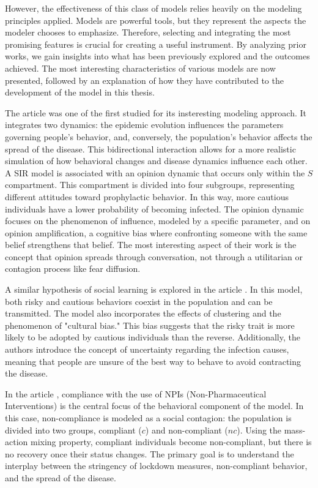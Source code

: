 However, the effectiveness of this class of models relies heavily on the modeling principles applied. Models are powerful tools, but they represent the aspects the modeler chooses to emphasize. Therefore, selecting and integrating the most promising features is crucial for creating a useful instrument. By analyzing prior works, we gain insights into what has been previously explored and the outcomes achieved.
The most interesting characteristics of various models are now presented, followed by an explanation of how they have contributed to the development of the model in this thesis.

The article \cite{Tyson_2020} was one of the first studied for its insteresting modeling approach. It integrates two dynamics: the epidemic evolution influences the parameters governing people's behavior, and, conversely, the population's behavior affects the spread of the disease. This bidirectional interaction allows for a more realistic simulation of how behavioral changes and disease dynamics influence each other.
A SIR model is associated with an opinion dynamic that occurs only within the $S$ compartment. This compartment is divided into four subgroups, representing different attitudes toward prophylactic behavior. In this way, more cautious individuals have a lower probability of becoming infected. The opinion dynamic focuses on the phenomenon of influence, modeled by a specific parameter, and on opinion amplification, a cognitive bias where confronting someone with the same belief strengthens that belief.
The most interesting aspect of their work is the concept that opinion spreads through conversation, not through a utilitarian or contagion process like fear diffusion.

A similar hypothesis of social learning is explored in the article \cite{Tanaka_2002}. In this model, both risky and cautious behaviors coexist in the population and can be transmitted. The model also incorporates the effects of clustering and the phenomenon of "cultural bias." This bias suggests that the risky trait is more likely to be adopted by cautious individuals than the reverse. Additionally, the authors introduce the concept of uncertainty regarding the infection causes, meaning that people are unsure of the best way to behave to avoid contracting the disease.


In the article \cite{Bongarti2023}, compliance with the use of NPIs (Non-Pharmaceutical Interventions) is the central focus of the behavioral component of the model. In this case, non-compliance is modeled as a social contagion: the population is divided into two groups, compliant ($c$) and non-compliant ($nc$). Using the mass-action mixing property, compliant individuals become non-compliant, but there is no recovery once their status changes. The primary goal is to understand the interplay between the stringency of lockdown measures, non-compliant behavior, and the spread of the disease.


